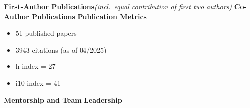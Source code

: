 \documentclass{article}
\begin{document}
\vspace{2mm}
{\large  \textbf{First-Author Publications}}\space\emph{(incl.\ equal contribution of first two authors)}
\vspace{-1em}\vspace{1mm}
\begingroup
	\setlength\bibitemsep{0pt}
	\nocite{*}
	\printbibliography[keyword=firstauthor, heading=none]
\endgroup
\vspace{-1em}\vspace{3mm}
{\large  \textbf{Co-Author Publications}}
\vspace{-1em}\vspace{1mm}
\begingroup
  \setlength\bibitemsep{0pt}
  \nocite{*}
  \printbibliography[keyword=coauthor, heading=none]
\endgroup
%
\vspace{0.5em}
%
{\large  \textbf{Publication Metrics}}
\begin{adjustwidth}{5mm}{}
  \begin{multicols}{2}
    \begin{itemize}[noitemsep,topsep=0pt, leftmargin=0mm]
      \item 51 published papers
      \item 3943 citations (as of 04/2025)
      \item h-index = 27
      \item i10-index = 41
    \end{itemize}
  \end{multicols}
\end{adjustwidth}
\vspace{3mm}
{\large  \textbf{Mentorship and Team Leadership}}
\end{document}
